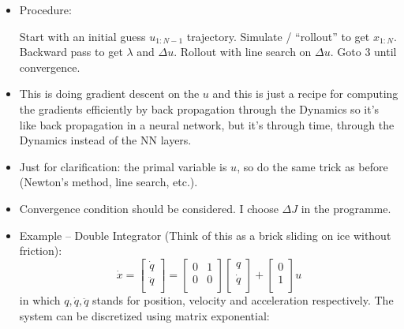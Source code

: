 \begin{itemize}
    \item Procedure:
    \begin{algorithmic}[1]
        \STATE Start with an initial guess $u_{1:N-1}$ trajectory.
        \STATE Simulate / ``rollout'' to get $x_{1:N}$.
        \STATE Backward pass to get $\lambda$ and $\Delta u$.
        \STATE Rollout with line search on $\Delta u$.
        \STATE Goto 3 until convergence. 
    \end{algorithmic}
    \item This is doing gradient descent on the $u$ and this is just a recipe for computing the gradients efficiently by back propagation through the Dynamics so it's like back propagation in a neural network, but it's through time, through the Dynamics instead of the NN layers.
    \item Just for clarification: the primal variable is $u$, so do the same trick as before (Newton's method, line search, etc.).
    \item Convergence condition should be considered. I choose $\Delta J$ in the programme.
    \item Example -- Double Integrator (Think of this as a brick sliding on ice without friction):
    \begin{equation}
        \dot{x}=\left[ \begin{array}{c}
            \dot{q}\\
            \ddot{q}\\
        \end{array} \right] =\left[ \begin{matrix}
            0&		1\\
            0&		0\\
        \end{matrix} \right] \left[ \begin{array}{c}
            q\\
            \dot{q}\\
        \end{array} \right] +\left[ \begin{array}{c}
            0\\
            1\\
        \end{array} \right] u
    \end{equation}
    in which $q, \dot q, \ddot q$ stands for position, velocity and acceleration respectively. The system can be discretized using matrix exponential:
    \begin{equation}

\end{equation}
\end{itemize}
